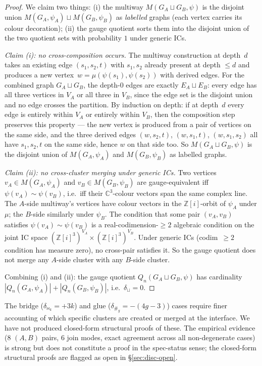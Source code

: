 \documentclass[12pt,a4paper]{article}
\theoremstyle{definition}
\theoremstyle{remark}
\newcommand{\bZi}{\mathbb{Z}[i]}            %
\newcommand{\bC}{\mathbb{C}}
\newcommand{\Qn}{Q_n}
\newcommand{\proj}{\mathrel{\sim}}          %
\newcommand{\bridge}{\mathbin{\bowtie}}     %
\newcommand{\glue}{\mathbin{\#}}            %
\begin{document}
\begin{proof}
We claim two things: (i) the multiway $M(G_A \sqcup G_B, \psi)$ is
the disjoint union $M(G_A, \psi_A) \sqcup M(G_B, \psi_B)$ as
\emph{labelled} graphs (each vertex carries its colour decoration);
(ii) the gauge quotient sorts them into the disjoint union of the
two quotient sets with probability $1$ under generic ICs.

\emph{Claim (i): no cross-composition occurs.} The multiway
construction at depth~$d$ takes an existing edge $(s_1, s_2, t)$ with
$s_1, s_2$ already present at depth $\le d$ and produces a new
vertex~$w = \mu(\psi(s_1), \psi(s_2))$ with derived edges. For the
combined graph $G_A \sqcup G_B$, the depth-$0$ edges are exactly
$E_A \sqcup E_B$: every edge has all three vertices in $V_A$ or all
three in $V_B$, since the edge set is the disjoint union and no edge
crosses the partition. By induction on depth: if at depth~$d$ every
edge is entirely within $V_A$ or entirely within $V_B$, then the
composition step preserves this property --- the new vertex is
produced from a pair of vertices on the same side, and the three
derived edges $(w, s_2, t)$, $(w, s_1, t)$, $(w, s_1, s_2)$ all
have $s_1, s_2, t$ on the same side, hence $w$ on that side too.
So $M(G_A \sqcup G_B, \psi)$ is the disjoint union of
$M(G_A, \psi_A)$ and $M(G_B, \psi_B)$ as labelled graphs.

\emph{Claim (ii): no cross-cluster merging under generic ICs.}
Two vertices $v_A \in M(G_A, \psi_A)$ and $v_B \in M(G_B, \psi_B)$
are gauge-equivalent iff $\psi(v_A) \proj \psi(v_B)$, i.e.\ iff their
$\bC^3$-colour vectors span the same complex line. The $A$-side
multiway's vertices have colour vectors in the $\bZi$-orbit of
$\psi_A$ under $\mu$; the $B$-side similarly under $\psi_B$. The
condition that some pair $(v_A, v_B)$ satisfies $\psi(v_A) \proj
\psi(v_B)$ is a real-codimension-$\ge 2$ algebraic condition on the
joint IC space $(\bZi^3)^{V_A} \times (\bZi^3)^{V_B}$. Under
generic ICs (codim~$\ge 2$ condition has measure zero), no cross-pair
satisfies it. So the gauge quotient does not merge any $A$-side
cluster with any $B$-side cluster.

Combining (i) and (ii): the gauge quotient $\Qn(G_A \sqcup G_B,
\psi)$ has cardinality $|\Qn(G_A, \psi_A)| + |\Qn(G_B, \psi_B)|$,
i.e.\ $\delta_{\sqcup} = 0$.
\end{proof}

The bridge ($\delta_{\bridge_k} = +3k$) and glue ($\delta_{\glue_g}
= -(4g - 3)$) cases require finer accounting of which specific
clusters are created or merged at the interface. We have not produced
closed-form structural proofs of these. The empirical evidence
($8$ $(A, B)$ pairs, $6$ join modes, exact agreement across all
non-degenerate cases) is strong but does not constitute a proof in the
spec-status sense; the closed-form structural proofs are flagged as
open in \S\ref{sec:disc-open}.
\end{document}
